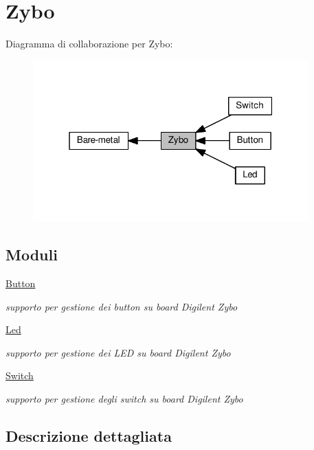\hypertarget{group___zybo}{}\section{Zybo}
\label{group___zybo}
Diagramma di collaborazione per Zybo\+:\nopagebreak
\begin{figure}[H]
\begin{center}
\leavevmode
\includegraphics[width=301pt]{group___zybo}
\end{center}
\end{figure}
\subsection*{Moduli}
\begin{DoxyCompactItemize}
\item 
\hyperlink{group___button}{Button}
\begin{DoxyCompactList}\small\item\em supporto per gestione dei button su board Digilent Zybo \end{DoxyCompactList}\item 
\hyperlink{group___led}{Led}
\begin{DoxyCompactList}\small\item\em supporto per gestione dei L\+ED su board Digilent Zybo \end{DoxyCompactList}\item 
\hyperlink{group___switch}{Switch}
\begin{DoxyCompactList}\small\item\em supporto per gestione degli switch su board Digilent Zybo \end{DoxyCompactList}\end{DoxyCompactItemize}


\subsection{Descrizione dettagliata}
